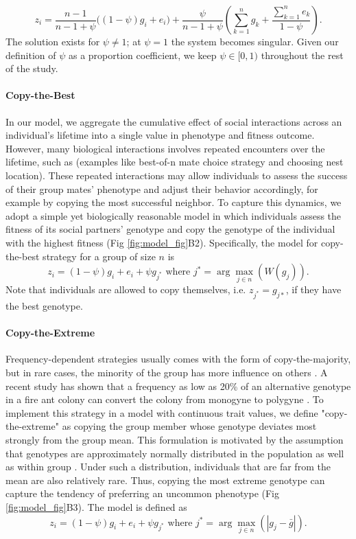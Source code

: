\documentclass{article}
\begin{document}
\begin{equation}
z_i
=
\frac{n-1}{n-1+\psi}\big((1-\psi)g_i + e_i\big)
+
\frac{\psi}{n-1+\psi}
\left(
\sum_{k=1}^n g_k
+
\frac{\sum_{k=1}^n e_k}{1-\psi}
\right).
\label{eq:ave_eq}
\end{equation}
The solution exists for $\psi\ne 1$; at $\psi =1$ the system becomes singular. Given our definition of $\psi$ as a proportion coefficient, we keep $\psi\in [0,1)$ throughout the rest of the study.


\paragraph{Copy-the-Best}
In our model, we aggregate the cumulative effect of social interactions across an individual's lifetime into a single value in phenotype and fitness outcome. However, many biological interactions involves repeated encounters over the lifetime, such as (examples like best-of-n mate choice strategy and choosing nest location). These repeated interactions may allow individuals to assess the success of their group mates' phenotype and adjust their behavior accordingly, for example by copying the most successful neighbor. To capture this dynamics, we adopt a simple yet biologically reasonable model in which individuals assess the fitness of its social partners' genotype and copy the genotype of the individual with the highest fitness \cite{Laland2004} (Fig \ref{fig:model_fig}B2). Specifically, the model for copy-the-best strategy for a group of size $n$ is 
\begin{equation}
    z_i = (1-\psi)g_i+e_i+ \psi g_{j^*} \text{ where }j^*=\arg\max_{j\in n}(W(g_j)).
\end{equation}
Note that individuals are allowed to copy themselves, i.e. $z_{j^*}=g_{j*}$, if they have the best genotype.

\paragraph{Copy-the-Extreme}
Frequency-dependent strategies usually comes with the form of copy-the-majority, but in rare cases, the minority of the group has more influence on others \cite{Laland2004}. A recent study has shown that a frequency as low as 20\% of an alternative genotype in a fire ant colony can convert the colony from monogyne to polygyne \cite{Zeng2025}. To implement this strategy in a model with continuous trait values, we define "copy-the-extreme" as copying the group member whose genotype deviates most strongly from the group mean. This formulation is motivated by the assumption that genotypes are approximately normally distributed in the population as well as within group \cite{Lande1976}. Under such a distribution, individuals that are far from the mean are also relatively rare. Thus, copying the most extreme genotype can capture the tendency of preferring an uncommon phenotype (Fig \ref{fig:model_fig}B3). The model is defined as 
\begin{equation}
    z_i = (1-\psi)g_i+e_i+ \psi g_{j^*} \text{ where }j^*=\arg\max_{j\in n}(|g_j-\bar{g}|).
\end{equation}
\end{document}
